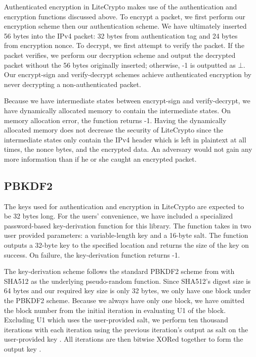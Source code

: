 \documentclass[12pt]{article}
\begin{document}
\begin{multicols}{2}
Authenticated encryption in LiteCrypto makes use of the authentication and encryption functions discussed above. To encrypt a packet, we first perform our encryption scheme then our authentication scheme. We have ultimately inserted 56 bytes into the IPv4 packet: 32 bytes from authentication tag and 24 bytes from encryption nonce. To decrypt, we first attempt to verify the packet. If the packet verifies, we perform our decryption scheme and output the decrypted packet without the 56 bytes originally inserted; otherwise, -1 is outputted as $\bot$. Our encrypt-sign and verify-decrypt schemes achieve authenticated encryption by never decrypting a non-authenticated packet.

Because we have intermediate states between encrypt-sign and verify-decrypt, we have dynamically allocated memory to contain the intermediate states. On memory allocation error, the function returns -1. Having the dynamically allocated memory does not decrease the security of LiteCrypto since the intermediate states only contain the IPv4 header which is left in plaintext at all times, the nonce bytes, and the encrypted data. An adversary would not gain any more information than if he or she caught an encrypted packet.

\subsection{PBKDF2}

The keys used for authentication and encryption in LiteCrypto are expected to be 32 bytes long. For the users' convenience, we have included a specialized password-based key-derivation function for this library. The function takes in two user provided parameters: a variable-length key and a 16-byte salt. The function outputs a 32-byte key to the specified location and returns the size of the key on success. On failure, the key-derivation function returns -1.

The key-derivation scheme follows the standard PBKDF2 scheme from \cite{PBKDF2Standard} with SHA512 as the underlying pseudo-random function. Since SHA512's digest size is 64 bytes \cite{NaClSiteHash} and our required key size is only 32 bytes, we only have one block under the PBKDF2 scheme. Because we always have only one block, we have omitted the block number from the initial iteration in evaluating U1 of the block. Excluding U1 which uses the user-provided salt, we perform ten thousand iterations with each iteration using the previous iteration's output as salt on the user-provided key \cite{PBKDF2Standard}. All iterations are then bitwise XORed together to form the output key \cite{PBKDF2Standard}.


\end{multicols}
\end{document}
